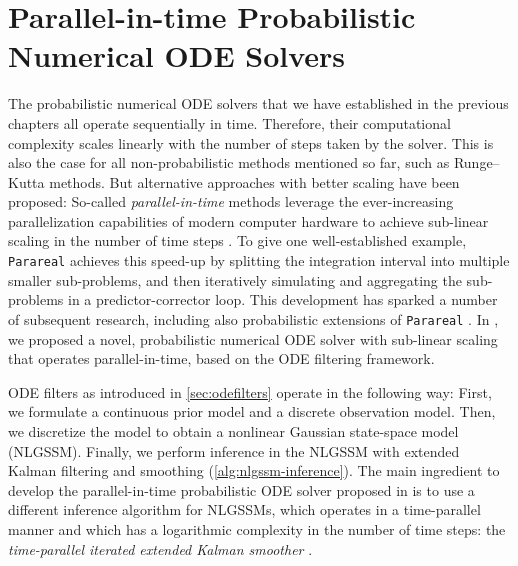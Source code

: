 \documentclass{mimosis}
\begin{document}
\chapter{Parallel-in-time Probabilistic Numerical ODE Solvers}
\label{sec:org550fc52}
\label{sec:parallel-in-time}
\label{sec:pint}

The probabilistic numerical ODE solvers that we have established in the previous chapters all operate sequentially in time.
Therefore, their computational complexity scales linearly with the number of steps taken by the solver.
This is also the case for all non-probabilistic methods mentioned so far, such as Runge--Kutta methods.
But alternative approaches with better scaling have been proposed:
So-called \emph{parallel-in-time} methods leverage the ever-increasing parallelization capabilities of modern computer hardware to achieve sub-linear scaling in the number of time steps \parencite{gander2015}.
To give one well-established example, \texttt{Parareal} \parencite{lions2001parareal}
achieves this speed-up by splitting the integration interval into multiple smaller sub-problems, and then iteratively simulating and aggregating the sub-problems in a predictor-corrector loop.
This development has sparked a number of subsequent research, including also probabilistic extensions of \texttt{Parareal}
\parencite{Pentland2021,Pentland2022,gattiglio2024nearest}.
In
\pint{},
we proposed a novel,
probabilistic numerical ODE solver with sub-linear scaling that operates parallel-in-time,
based on the ODE filtering framework.

ODE filters as introduced in \cref{sec:odefilters} operate in the following way:
First, we formulate a continuous prior model and a discrete observation model.
Then, we discretize the model to obtain a nonlinear Gaussian state-space model (NLGSSM).
Finally, we perform inference in the NLGSSM with extended Kalman filtering and smoothing (\cref{alg:nlgssm-inference}).
The main ingredient to develop the parallel-in-time probabilistic ODE solver proposed in \pint{} is to use a different inference algorithm for NLGSSMs, which operates in a time-parallel manner and which has a logarithmic complexity in the number of time steps:
the \emph{time-parallel iterated extended Kalman smoother}
\parencite{Yaghoobi2021,Yaghoobi2022}.
\end{document}
